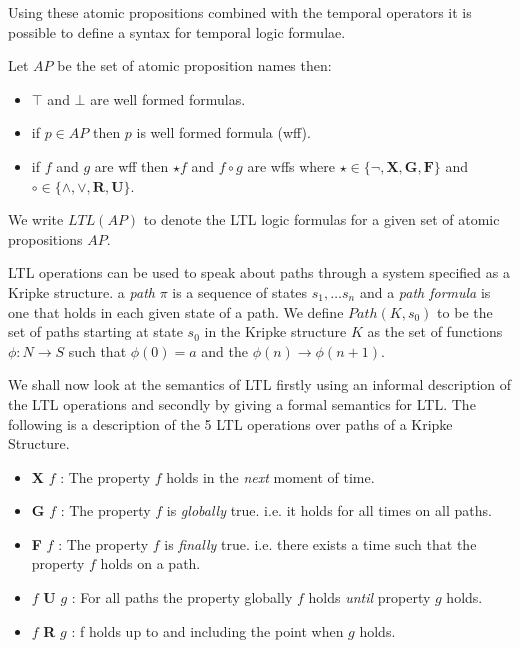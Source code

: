 Using these atomic propositions combined with the temporal operators it is possible to define a syntax for temporal logic formulae.

\begin{mydef}
Let $AP$ be the set of atomic proposition names then:

\begin{itemize}
\item $\top$ and $\bot$ are well formed formulas.
\item if $p \in AP$ then $p$ is well formed formula (wff).

\item if $f$ and $g$ are wff  then $\star f$ and $f \circ g$ are wffs where $\star \in \{\neg,\mathbf{X},\mathbf{G}, \mathbf{F}\}$ and $\circ \in \{ \wedge,\vee,\textbf{R},\textbf{U} \}$.
\end{itemize}

\end{mydef}
We write $LTL(AP)$ to denote the LTL logic formulas for a given set of atomic propositions $AP$.

LTL operations can be used to speak about paths through a system specified as a Kripke structure.
a \emph{path} $\pi$ is a sequence of states $s_1, \ldots s_n$ and a \emph{path formula} is one that holds in each given state of a path. We define $Path(K,s_0)$ to be the set of paths starting at state $s_0$ in the Kripke structure $K$ as the set of functions $\phi : N \to S$ such that $\phi(0) = a$ and the $\phi(n) \to \phi(n+1)$. 

We shall now look at the semantics of LTL firstly using an informal description of the LTL operations and secondly by giving a formal semantics for LTL. The following is a description of the 5 LTL operations over paths of a Kripke Structure.

\begin{itemize}
\item \textbf{X} $f$ : The property $f$ holds in the \emph{next} moment of time.
\item \textbf{G} $f$ : The property $f$ is \emph{globally} true. i.e. it holds for all times on all paths. 
\item \textbf{F} $f$ : The property $f$ is \emph{finally} true. i.e. there exists a time such that the property $f$ holds on a path.
\item $f$ \textbf{U} $g$ : For all paths the property globally $f$ holds \emph{until} property $g$ holds. 
\item $f$ \textbf{R} $g$ : f holds up to and including the point when $g$ holds.
\end{itemize}

